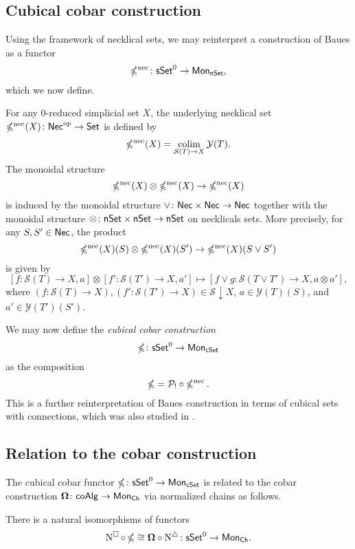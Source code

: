 \subsection{Cubical cobar construction}

Using the framework of necklical sets, we may reinterpret a construction of Baues as a functor
\begin{equation*}
\operatorname{\mathbb{\Omega}^{\mathrm{nec}}} \colon \mathsf{sSet}^0 \to \mathsf{Mon}_{\mathsf{nSet}},
\end{equation*}
which we now define.

For any $0$-reduced simplicial set $X$, the underlying necklical set $\operatorname{\mathbb{\Omega}^{\mathrm{nec}}}(X) \colon \mathsf{Nec}^{\mathrm{op}} \to \mathsf{Set}$ is defined by
\begin{equation*}
\operatorname{\mathbb{\Omega}^{\mathrm{nec}}}(X) = \operatorname*{colim}_{\mathcal{S}(T) \to X} \mathcal{Y}(T).
\end{equation*}
The monoidal structure
$$\operatorname{\mathbb{\Omega}^{\mathrm{nec}}}(X) \otimes \operatorname{\mathbb{\Omega}^{\mathrm{nec}}}(X) \to \operatorname{\mathbb{\Omega}^{\mathrm{nec}}}(X)$$
is induced by the monoidal structure $\vee \colon \mathsf{Nec} \times \mathsf{Nec} \to \mathsf{Nec}$ together with the monoidal structure $\otimes \colon \mathsf{nSet} \times \mathsf{nSet} \to \mathsf{nSet}$ on necklicals sets.
More precisely, for any $S, S' \in \mathsf{Nec}$, the product $$\operatorname{\mathbb{\Omega}^{\mathrm{nec}}}(X)(S) \otimes \operatorname{\mathbb{\Omega}^{\mathrm{nec}}}(X)(S') \to \operatorname{\mathbb{\Omega}^{\mathrm{nec}}}(X)(S \vee S')$$ is given by $$[f\colon \mathcal{S}(T) \to X, a] \otimes [f'\colon \mathcal{S}(T') \to X, a'] \mapsto [f \vee g\colon \mathcal{S}(T\vee T') \to X, a \otimes  a'],$$
where $(f\colon \mathcal{S}(T) \to X), (f'\colon \mathcal{S}(T') \to X) \in \mathcal{S} \downarrow X$, $a\in \mathcal{Y}(T)(S)$, and $a'\in \mathcal{Y}(T')(S')$.

We may now define the \textit{cubical cobar construction}
$$\operatorname{\mathbb{\Omega}} \colon \mathsf{sSet}^0 \to \mathsf{Mon}_{\mathsf{cSet}}$$ as the composition $$\operatorname{\mathbb{\Omega}}= \mathcal{P}_! \circ \operatorname{\mathbb{\Omega}^{\mathrm{nec}}}.$$ This is a further reinterpretation of Baues construction in terms of cubical sets with connections, which was also studied in \cite{rivera2018cubical}.

\subsection{Relation to the cobar construction}

The cubical cobar functor $\operatorname{\mathbb{\Omega}}\colon \mathsf{sSet}^0 \to \mathsf{Mon}_{\mathsf{cSet}}$ is related to the cobar construction $\mathbf{\Omega}\colon \mathsf{coAlg} \to \mathsf{Mon}_{\mathsf{Ch}}$ via normalized chains as follows.

\begin{proposition} \label{p:ccobar and cobar}
	There is a natural isomorphisms of functors 
	\begin{equation*}
	\operatorname{N^{\square}} \circ \operatorname{\mathbb{\Omega}} \cong \mathbf{\Omega} \circ \operatorname{N^{\triangle}} \colon \mathsf{sSet}^0 \to \mathsf{Mon}_{\mathsf{Ch}}.
	\end{equation*}
\end{proposition}

